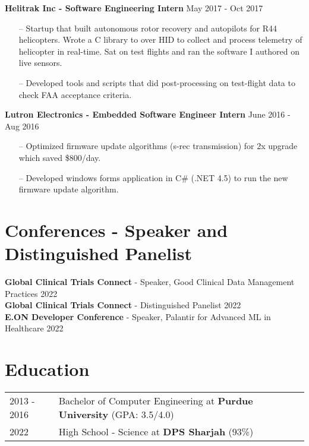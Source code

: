 \documentclass[a4paper,12pt]{article}
\begin{document}
\textbf{Helitrak Inc - Software Engineering Intern} \hfill May 2017 - Oct 2017
    \begin{itemize}[nosep,after=\strut, leftmargin=1em, itemsep=3pt]
        \item[--] Startup that built autonomous rotor recovery and autopilots for R44 helicopters. Wrote a C library to over HID to collect and process telemetry of helicopter in real-time. Sat on test flights and ran the software I authored on live sensors.
        \item[--] Developed tools and scripts that did post-processing on test-flight data to check FAA acceptance criteria.
    \end{itemize}

\textbf{Lutron Electronics - Embedded Software Engineer Intern} \hfill June 2016 - Aug 2016
    \begin{itemize}[nosep,after=\strut, leftmargin=1em, itemsep=3pt]
        \item[--] Optimized firmware update algorithms (s-rec transmission) for 2x upgrade which saved \$800/day.
        \item[--] Developed windows forms application in C# (.NET 4.5) to run the new firmware update algorithm.
    \end{itemize}
    
\section{Conferences - Speaker and Distinguished Panelist}
\textbf{Global Clinical Trials Connect}  - Speaker, Good Clinical Data Management Practices  \hfill 2022 \\
\textbf{Global Clinical Trials Connect} - Distinguished Panelist \hfill 2022 \\
\textbf{E.ON Developer Conference} - Speaker, Palantir for Advanced ML in Healthcare \hfill 2022 \\

\section{Education}
\begin{tabularx}{\linewidth}{@{}l X@{}}	
2013 - 2016 & Bachelor of Computer Engineering at \textbf{Purdue University} \hfill \normalsize (GPA: 3.5/4.0) \\
2022 & High School - Science at \textbf{DPS Sharjah} \hfill  (93\%) \\
\end{tabularx}
\end{document}

